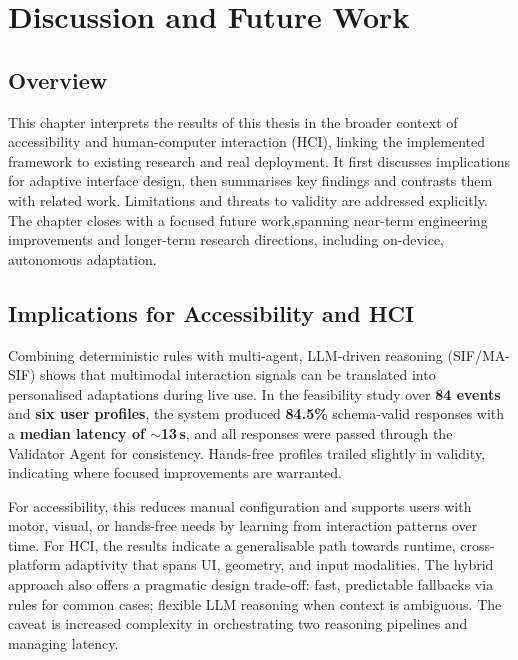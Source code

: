 \chapter{Discussion and Future Work}
\label{ch:chapter7}
\section{Overview}
This chapter interprets the results of this thesis in the broader context of accessibility and human-computer interaction (HCI), linking the implemented framework to existing research and real deployment. It first discusses implications for adaptive interface design, then summarises key findings and contrasts them with related work. Limitations and threats to validity are addressed explicitly. The chapter closes with a focused future work,spanning near-term engineering improvements and longer-term research directions, including on-device, autonomous adaptation.

\section{Implications for Accessibility and HCI}
Combining deterministic rules with multi-agent, LLM-driven reasoning (SIF/MA-SIF) shows that multimodal interaction signals can be translated into personalised adaptations during live use. In the feasibility study over \textbf{84 events} and \textbf{six user profiles}, the system produced \textbf{84.5\%} schema-valid responses with a \textbf{median latency of $\sim$13\,s}, and all responses were passed through the Validator Agent for consistency. Hands-free profiles trailed slightly in validity, indicating where focused improvements are warranted.

For accessibility, this reduces manual configuration and supports users with motor, visual, or hands-free needs by learning from interaction patterns over time. For HCI, the results indicate a generalisable path towards runtime, cross-platform adaptivity that spans UI, geometry, and input modalities. The hybrid approach also offers a pragmatic design trade-off: fast, predictable fallbacks via rules for common cases; flexible LLM reasoning when context is ambiguous. The caveat is increased complexity in orchestrating two reasoning pipelines and managing latency.

